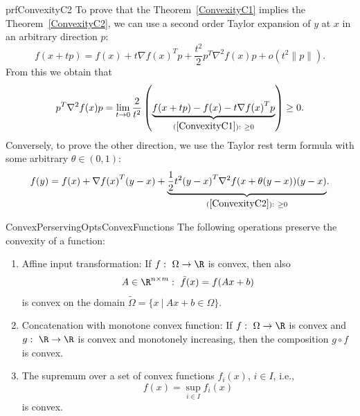 \begin{prf}{prfConvexityC2}
    To prove that the Theorem~\ref{ConvexityC1} implies the Theorem~\ref{ConvexityC2}, we can use a second order Taylor expansion of $y$ at $x$ in an arbitrary direction $p$:
    \begin{equation*}
        f(x + tp) = f(x) + t \nabla {f(x)}^T p + \frac{t^2}{2} p^T \nabla^2 f(x) p + o(t^2\|p\|).
    \end{equation*}
    From this we obtain that
    \begin{equation*}
        p^T \nabla^2 f(x) p = \lim_{t \rightarrow 0} \frac{2}{t^2} \left(\underset{(\ref*{ConvexityC1}): \ \geq 0}{\underbrace{f(x + tp) - f(x) - t \nabla {f(x)}^T p}}\right) \geq 0.
    \end{equation*}
    Conversely, to prove the other direction, we use the Taylor rest term formula with some arbitrary $\theta \in (0,1)$:
    \begin{equation*}
        f(y) = f(x) + \nabla {f(x)}^T(y-x) + \underset{(\ref*{ConvexityC2}): \ \geq 0}{\underbrace{\frac{1}{2}t^2 {(y-x)}^T \nabla^2 f(x + \theta(y-x)) (y-x)}}. 
    \end{equation*}
    \vspace{-0.7cm}
\end{prf}

\begin{pro}{ConvexPerservingOptsConvexFunctions}
    The following operations preserve the convexity of a function:
    \begin{enumerate}
        \item 
            Affine input transformation: If $f: \ \Omega \rightarrow \R$ is convex, then also
            \begin{equation*}
                A \in \R^{n \times m}: \ \tilde{f}(x) = f(Ax + b)
            \end{equation*}
            is convex on the domain $\tilde{\Omega} = \{x \ | \ Ax + b \in \Omega\}$.
        \item 
            Concatenation with monotone convex function: If $f: \ \Omega \rightarrow \R$ is convex and $g: \ \R \rightarrow \R$ is convex and monotonely increasing, then the composition $g \circ f$ is convex.
        \item 
            The supremum over a set of convex functions $f_i(x)$, $i \in I$, i\@.e\@.,
            \begin{equation*}
                f(x) = \sup_{i \in I} f_i(x)
            \end{equation*}
            is convex.
    \end{enumerate}
    \vspace*{-0.2cm}
\end{pro}

